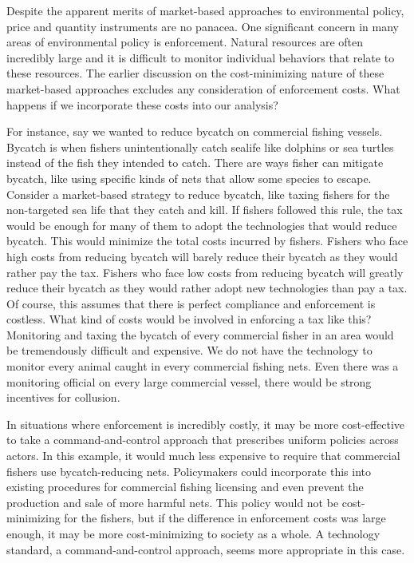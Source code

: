 Despite the apparent merits of market-based approaches to environmental policy, price and quantity instruments are no panacea. One significant concern in many areas of environmental policy is enforcement. Natural resources are often incredibly large and it is difficult to monitor individual behaviors that relate to these resources. The earlier discussion on the cost-minimizing nature of these market-based approaches excludes any consideration of enforcement costs. What happens if we incorporate these costs into our analysis?

For instance, say we wanted to reduce bycatch on commercial fishing vessels. Bycatch is when fishers unintentionally catch sealife like dolphins or sea turtles instead of the fish they intended to catch. There are ways fisher can mitigate bycatch, like using specific kinds of nets that allow some species to escape.
Consider a market-based strategy to reduce bycatch, like taxing fishers for the non-targeted sea life that they catch and kill. If fishers followed this rule, the tax would be enough for many of them to adopt the technologies that would reduce bycatch. This would minimize the total costs incurred by fishers. Fishers who face high costs from reducing bycatch will barely reduce their bycatch as they would rather pay the tax. Fishers who face low costs from reducing bycatch will greatly reduce their bycatch as they would rather adopt new technologies than pay a tax. Of course, this assumes that there is perfect compliance and enforcement is costless. What kind of costs would be involved in enforcing a tax like this? Monitoring and taxing the bycatch of every commercial fisher in an area would be tremendously difficult and expensive. We do not have the technology to monitor every animal caught in every commercial fishing nets. Even there was a monitoring official on every large commercial vessel, there would be strong incentives for collusion. 

In situations where enforcement is incredibly costly, it may be more cost-effective to take a command-and-control approach that prescribes uniform policies across actors. In this example, it would much less expensive to require that commercial fishers use bycatch-reducing nets. Policymakers could incorporate this into existing procedures for commercial fishing licensing and even prevent the production and sale of more harmful nets. This policy would not be cost-minimizing for the fishers, but if the difference in enforcement costs was large enough, it may be more cost-minimizing to society as a whole. A technology standard, a command-and-control approach, seems more appropriate in this case.


